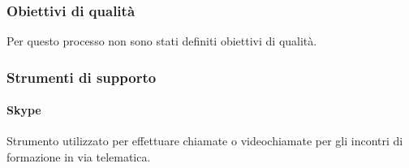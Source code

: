 		\subsubsection{Obiettivi di qualità}
			Per questo processo non sono stati definiti obiettivi di qualità.
		\subsubsection{Strumenti di supporto}
			\paragraph{Skype}
		 		Strumento utilizzato per effettuare chiamate o videochiamate per gli incontri di formazione in via telematica.
			
